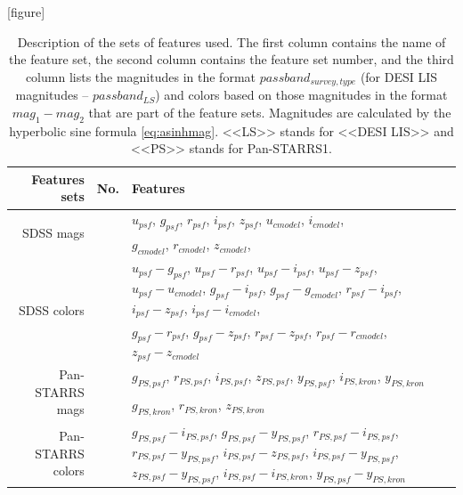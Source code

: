 \documentclass[fleqn,usenatbib]{mnras}
\begin{document}
\begin{table}
    \label{tab:featuressets}
    \caption{Description of the sets of features used. The first column contains the name of the feature set, the second column contains the feature set number, and the third column lists the magnitudes in the format $passband_{survey, type}$ (for DESI LIS magnitudes -- $passband_{LS}$) and colors based on those magnitudes in the format $mag_1 - mag_2$ that are part of the feature sets. Magnitudes are calculated by the hyperbolic sine formula \eqref{eq:asinhmag}. <<LS>> stands for <<DESI LIS>> and <<PS>> stands for Pan-STARRS1.}
    [figure] 
    \renewcommand{\theFeatsSetNumber}{\arabic{FeatsSetNumber}}
    \setcounter{FeatsSetNumber}{0}
	\begin{tabular}{ r l p{10cm} }
	\hline
	    Features sets & No. & Features \\
    \hline
        \multirow{2}{*}{SDSS mags} & {FeatsSetNumber}\theFeatsSetNumber\label{feats:sdss-mags-1} & \(u_{psf}\), \(g_{psf}\), \(r_{psf}\), \(i_{psf}\), \(z_{psf}\), \(u_{cmodel}\), \(i_{cmodel}\), \\
         & {FeatsSetNumber}\theFeatsSetNumber\label{feats:sdss-mags-2} & \(g_{cmodel}\), \(r_{cmodel}\), \(z_{cmodel}\), \\
        \multirow{2}{*}{SDSS colors} & {FeatsSetNumber}\theFeatsSetNumber\label{feats:sdss-colors-1} & \(u_{psf}-g_{psf}\), \(u_{psf}-r_{psf}\), \(u_{psf}-i_{psf}\), \(u_{psf}-z_{psf}\), \(u_{psf}-u_{cmodel}\), \(g_{psf}-i_{psf}\), \(g_{psf}-g_{cmodel}\), \(r_{psf}-i_{psf}\), \(i_{psf}-z_{psf}\), \(i_{psf}-i_{cmodel}\), \\
         & {FeatsSetNumber}\theFeatsSetNumber\label{feats:sdss-colors-2} & \(g_{psf}-r_{psf}\), \(g_{psf}-z_{psf}\), \(r_{psf}-z_{psf}\), \(r_{psf}-r_{cmodel}\), \(z_{psf}-z_{cmodel}\) \\
    \hline
        \multirow{2}{*}{Pan-STARRS mags} & {FeatsSetNumber}\theFeatsSetNumber\label{feats:ps-mags-1} & \(g_{PS,psf}\), \(r_{PS,psf}\), \(i_{PS,psf}\), \(z_{PS,psf}\), \(y_{PS,psf}\), \(i_{PS,kron}\), \(y_{PS,kron}\) \\
         & {FeatsSetNumber}\theFeatsSetNumber\label{feats:ps-mags-2} & \(g_{PS,kron}\), \(r_{PS,kron}\), \(z_{PS,kron}\) \\
        \multirow{2}{*}{Pan-STARRS colors} & {FeatsSetNumber}\theFeatsSetNumber\label{feats:ps-colors-1} & \(g_{PS,psf}-i_{PS,psf}\), \(g_{PS,psf}-y_{PS,psf}\), \(r_{PS,psf}-i_{PS,psf}\), \(r_{PS,psf}-y_{PS,psf}\), \(i_{PS,psf}-z_{PS,psf}\), \(i_{PS,psf}-y_{PS,psf}\), \(z_{PS,psf}-y_{PS,psf}\), \(i_{PS,psf}-i_{PS,kron}\), \(y_{PS,psf}-y_{PS,kron}\) \\

\end{tabular}
\end{table}
\end{document}
